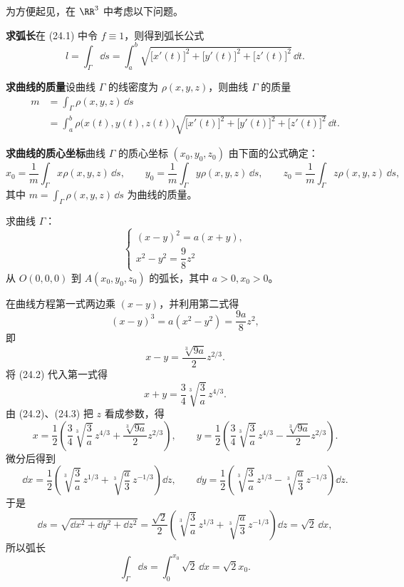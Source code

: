 为方便起见，在 $\RR^3$ 中考虑以下问题。

\textbf{求弧长}\quad 在 (24.1) 中令 $f\equiv1$，则得到弧长公式
\[
  l=\int_\Gamma\dd s=\int_a^b\sqrt{\bigl[x'(t)\bigr]^2+\bigl[y'(t)\bigr]^2+\bigl[z'(t)\bigr]^2}\,\dd t.
\]

\textbf{求曲线的质量}\quad 设曲线 $\Gamma$ 的线密度为 $\rho(x,y,z)$，则曲线 $\Gamma$ 的质量
\begin{align*}
  m&=\int_\Gamma\rho(x,y,z)\,\dd s\\
  &=\int_a^b\rho\bigl(x(t),y(t),z(t)\bigr)\sqrt{\bigl[x'(t)\bigr]^2+\bigl[y'(t)\bigr]^2+\bigl[z'(t)\bigr]^2}\,\dd t.
\end{align*}

\textbf{求曲线的质心坐标}\quad 曲线 $\Gamma$ 的质心坐标 $(x_0,y_0,z_0)$ 由下面的公式确定：
\[
  x_0=\frac1m\int_\Gamma x\rho(x,y,z)\,\dd s,\qquad y_0=\frac1m\int_\Gamma y\rho(x,y,z)\,\dd s,\qquad z_0=\frac1m\int_\Gamma z\rho(x,y,z)\,\dd s,
\]
其中 $m=\int_\Gamma\rho(x,y,z)\,\dd s$ 为曲线的质量。

\begin{xexample}[24.1.2]
求曲线 $\Gamma$：
\[
  \begin{cases}
    (x-y)^2=a(x+y),\\
    x^2-y^2=\dfrac98z^2
  \end{cases}
\]
从 $O(0,0,0)$ 到 $A(x_0,y_0,z_0)$ 的弧长，其中 $a>0,x_0>0$。
\end{xexample}
\begin{xsolution}
在曲线方程第一式两边乘 $(x-y)$，并利用第二式得
\[
  (x-y)^3=a(x^2-y^2)=\frac{9a}{8}z^2,
\]
即
\begin{equation}
  x-y=\frac{\sqrt[3]{9a}}{2}z^{2/3}.
  \tag{24.2}
  \label{eq:24.2}
\end{equation}
将 (24.2) 代入第一式得
\begin{equation}
  x+y=\frac34\sqrt[3]{\frac3a}\,z^{4/3}.
  \tag{24.3}
  \label{eq:24.3}
\end{equation}
由 (24.2)、(24.3) 把 $z$ 看成参数，得
\[
  x=\frac12\left(\frac34\sqrt[3]{\frac3a}\,z^{4/3}+\frac{\sqrt[3]{9a}}2z^{2/3}\right),\qquad
  y=\frac12\left(\frac34\sqrt[3]{\frac3a}\,z^{4/3}-\frac{\sqrt[3]{9a}}2z^{2/3}\right).
\]
微分后得到
\[
  \dd x=\frac12\left(\sqrt[3]{\frac3a}\,z^{1/3}+\sqrt[3]{\frac a3}\,z^{-1/3}\right)\dd z,\qquad
  \dd y=\frac12\left(\sqrt[3]{\frac3a}\,z^{1/3}-\sqrt[3]{\frac a3}\,z^{-1/3}\right)\dd z.
\]
于是
\[
  \dd s=\sqrt{\dd x^2+\dd y^2+\dd z^2}=\frac{\sqrt2}{2}\left(\sqrt[3]{\frac3a}\,z^{1/3}+\sqrt[3]{\frac a3}\,z^{-1/3}\right)\dd z=\sqrt2\,\dd x,
\]
所以弧长
\[
  \int_\Gamma\dd s=\int_0^{x_0}\sqrt2\,\dd x=\sqrt2x_0.
\]
\end{xsolution}

